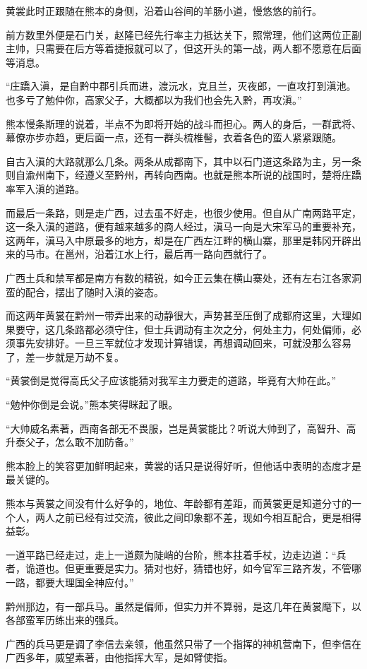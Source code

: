黄裳此时正跟随在熊本的身侧，沿着山谷间的羊肠小道，慢悠悠的前行。

前方数里外便是石门关，赵隆已经先行率主力抵达关下，照常理，他们这两位正副主帅，只需要在后方等着捷报就可以了，但这开头的第一战，两人都不愿意在后面等消息。

“庄蹻入滇，是自黔中郡引兵而进，渡沅水，克且兰，灭夜郎，一直攻打到滇池。也多亏了勉仲你，高家父子，大概都以为我们也会先入黔，再攻滇。”

熊本慢条斯理的说着，半点不为即将开始的战斗而担心。两人的身后，一群武将、幕僚亦步亦趋，更后面一点，还有一群头梳椎髻，衣着各色的蛮人紧紧跟随。

自古入滇的大路就那么几条。两条从成都南下，其中以石门道这条路为主，另一条则自渝州南下，经遵义至黔州，再转向西南。也就是熊本所说的战国时，楚将庄蹻率军入滇的道路。

而最后一条路，则是走广西，过去虽不好走，也很少使用。但自从广南两路平定，这一条入滇的道路，便有越来越多的商人经过，滇马一向是大宋军马的重要补充，这两年，滇马入中原最多的地方，却是在广西左江畔的横山寨，那里是韩冈开辟出来的马市。在邕州，沿着江水上行，最后再一路向西就行了。

广西土兵和禁军都是南方有数的精锐，如今正云集在横山寨处，还有左右江各家洞蛮的配合，摆出了随时入滇的姿态。

而这两年黄裳在黔州一带弄出来的动静很大，声势甚至压倒了成都府这里，大理如果要守，这几条路都必须守住，但士兵调动有主次之分，何处主力，何处偏师，必须事先安排好。一旦三军就位才发现计算错误，再想调动回来，可就没那么容易了，差一步就是万劫不复。

“黄裳倒是觉得高氏父子应该能猜对我军主力要走的道路，毕竟有大帅在此。”

“勉仲你倒是会说。”熊本笑得眯起了眼。

“大帅威名素著，西南各部无不畏服，岂是黄裳能比？听说大帅到了，高智升、高升泰父子，怎么敢不加防备。”

熊本脸上的笑容更加鲜明起来，黄裳的话只是说得好听，但他话中表明的态度才是最关键的。

熊本与黄裳之间没有什么好争的，地位、年龄都有差距，而黄裳更是知道分寸的一个人，两人之前已经有过交流，彼此之间印象都不差，现如今相互配合，更是相得益彰。

一道平路已经走过，走上一道颇为陡峭的台阶，熊本拄着手杖，边走边道：“兵者，诡道也。但更重要是实力。猜对也好，猜错也好，如今官军三路齐发，不管哪一路，都要大理国全神应付。”

黔州那边，有一部兵马。虽然是偏师，但实力并不算弱，是这几年在黄裳麾下，以各部蛮军历练出来的强兵。

广西的兵马更是调了李信去亲领，他虽然只带了一个指挥的神机营南下，但李信在广西多年，威望素著，由他指挥大军，是如臂使指。

